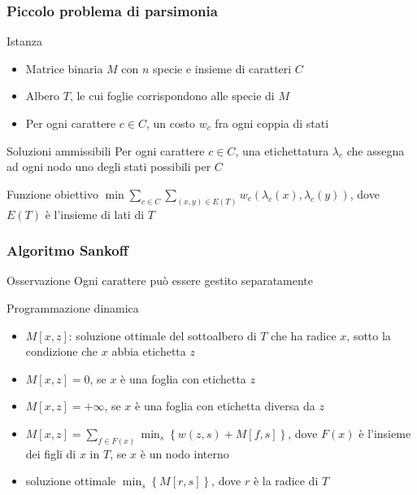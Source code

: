 \begin{frame}[fragile]
\frametitle{Piccolo problema di parsimonia}
\begin{block}{Istanza}
\begin{itemize}
\item
Matrice binaria $M$ con $n$ specie e insieme di caratteri $C$
\item
Albero $T$, le cui foglie corrispondono alle specie di $M$
\item
Per ogni carattere $c\in C$, un costo $w_{c}$ fra ogni coppia di stati
\end{itemize}
\end{block}
\begin{block}{Soluzioni ammissibili}
Per ogni carattere $c\in C$, una etichettatura $\lambda_{c}$ che assegna ad ogni nodo
uno degli stati possibili per $C$
\end{block}
\begin{block}{Funzione obiettivo}
$\min \sum_{c\in C} \sum_{(x,y)\in E(T)} w_{c}(\lambda_{c}(x), \lambda_{c}(y))$, dove $E(T)$ è
l'insieme di lati di $T$
\end{block}
\end{frame}

\begin{frame}[fragile]
\frametitle{Algoritmo Sankoff}
\begin{block}{Osservazione}
Ogni carattere può essere gestito separatamente
\end{block}

\begin{block}{Programmazione dinamica}
\begin{itemize}
\item
$M[x,z]$: soluzione ottimale del sottoalbero di $T$ che ha radice $x$, sotto la
condizione che $x$ abbia etichetta $z$
\item
$M[x,z] = 0$, se $x$ è una foglia con etichetta $z$
\item
$M[x,z] = +\infty$, se $x$ è una foglia con etichetta diversa da $z$
\item
$M[x,z] = \sum_{f \in F(x)} \min_{s} \left\{ w(z,s) + M[f,s] \right\}$, dove $F(x)$ è
l'insieme dei figli di $x$ in $T$, se $x$ è un nodo interno
\item
soluzione ottimale $\min_{s} \left\{ M[r,s] \right\}$, dove $r$ è la radice di
$T$
\end{itemize}
\end{block}
\end{frame}



